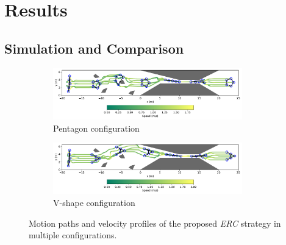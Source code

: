 \section{Results}\label{sec4}
\subsection{Simulation and Comparison}
\begin{figure}[!h]
\begin{subfigure}[b]{\textwidth}
    
    \centering
    \includegraphics[width=0.9\textwidth]{paper2/images/path_edc_shape1.pdf}
    \caption{Pentagon configuration}
    \label{fig:1path_edc1}
\end{subfigure}
\begin{subfigure}[b]{\textwidth}
    \centering
    \includegraphics[width=0.9\textwidth]{paper2/images/path_edc_shape2.pdf}
    \caption{V-shape configuration}
    \label{fig:1path_edc2}
\end{subfigure}
\caption{Motion paths and velocity profiles of the proposed \textit{ERC} strategy in multiple configurations.}
\label{fig:1path}
\end{figure}

